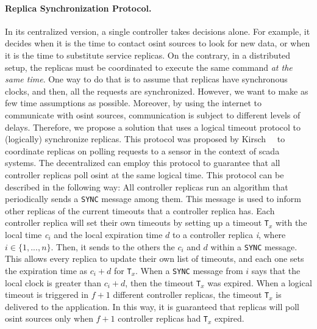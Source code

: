 \paragraph{Replica Synchronization Protocol.}
In its centralized version, a single \system controller takes decisions alone.
For example, it decides when it is the time to contact \gls{osint} sources to look for new data, or when it is the time to substitute service replicas.
On the contrary, in a distributed setup, the replicas must be coordinated to execute the same command \emph{at the same time}.
One way to do that is to assume that replicas have synchronous clocks, and then, all the requests are synchronized.
However, we want to make as few time assumptions as possible.
Moreover, by using the internet to communicate with \gls{osint} sources, \system communication is subject to different levels of delays.
Therefore, we propose a solution that uses a logical timeout protocol to (logically) synchronize replicas.
This protocol was proposed by Kirsch~\etal{}~\cite{Kirsch:2014} to coordinate replicas on polling requests to a sensor in the context of \gls{scada} systems.
The decentralized \system can employ this protocol to guarantee that all controller replicas poll \gls{osint} at the same logical time.
This protocol can be described in the following way:
All controller replicas run an algorithm that periodically sends a \texttt{SYNC} message among them.
This message is used to inform other replicas of the current timeouts that a controller replica has.
Each controller replica will set their own timeouts by setting up a timeout \texttt{T$_x$} with the local time \emph{c$_i$} and the local expiration time \emph{$d$} to a controller replica \emph{i}, where $i \in \{1, ..., n\}$.
Then, it sends to the others the \emph{$c_i$} and \emph{$d$} within a \texttt{SYNC} message.
This allows every replica to update their own list of timeouts, and each one sets the expiration time as \emph{$c_i + d$} for \texttt{T$_x$}.
When a \texttt{SYNC} message from $i$ says that the local clock is greater than \emph{$c_i + d$}, then the timeout \texttt{T$_x$} was expired.
When a logical timeout is triggered in $f+1$ different controller replicas, the timeout \texttt{T$_x$} is delivered to the application.
In this way, it is guaranteed that replicas will poll \gls{osint} sources only when $f+1$ controller replicas had \texttt{T$_x$} expired.
 


